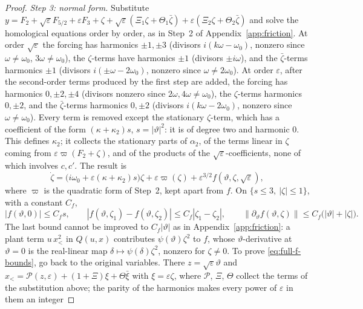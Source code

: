 \documentclass[11pt,reqno]{amsart}
\theoremstyle{plain}
\theoremstyle{definition}
\theoremstyle{remark}
\begin{document}
\begin{proof}
\emph{Step 3: normal form.} Substitute
$y=F_2+\sqrt\varepsilon F_{5/2}+\varepsilon F_3+\zeta+\sqrt\varepsilon(\Xi_1\zeta+\Theta_1\bar\zeta)+\varepsilon(\Xi_2\zeta+\Theta_2\bar\zeta)$ and solve the
homological equations order by order, as in Step~2 of Appendix~\ref{app:friction}. At order $\sqrt\varepsilon$ the forcing has
harmonics $\pm1,\pm3$ (divisors $i(k\omega-\omega_0)$, nonzero since $\omega\ne\omega_0$, $3\omega\ne\omega_0$), the $\zeta$-terms have
harmonics $\pm1$ (divisors $\pm i\omega$), and the $\bar\zeta$-terms harmonics $\pm1$ (divisors $i(\pm\omega-2\omega_0)$, nonzero since
$\omega\ne2\omega_0$). At order $\varepsilon$, after the second-order terms produced by the first step are added, the forcing has
harmonics $0,\pm2,\pm4$ (divisors nonzero since $2\omega,4\omega\ne\omega_0$), the $\zeta$-terms harmonics $0,\pm2$, and the
$\bar\zeta$-terms harmonics $0,\pm2$ (divisors $i(k\omega-2\omega_0)$, nonzero since $\omega\ne\omega_0$). Every term is removed except
the stationary $\zeta$-term, which has a coefficient of the form $(\kappa+\kappa_2)s$, $s=|\vartheta|^{2}$: it is of degree two and
harmonic $0$. This defines $\kappa_2$; it collects the stationary parts of $\alpha_2$, of the terms linear in $\zeta$ coming from $\varepsilon\varpi(F_2+\zeta)$, and of the products of the $\sqrt\varepsilon$-coefficients, none of which involves $c,c'$. The result is
\[
  \dot\zeta=\bigl(i\omega_0+\varepsilon(\kappa+\kappa_2)s\bigr)\zeta+\varepsilon\varpi(\zeta)+\varepsilon^{3/2}f(\vartheta,\zeta,\sqrt\varepsilon),
\]
where $\varpi$ is the quadratic form of Step~2, kept apart from $f$. On $\{s\le3,\ |\zeta|\le1\}$, with a constant $C_f$,
\begin{equation}\label{eq:full-f-bounds}
  |f(\vartheta,0)|\le C_fs,\qquad |f(\vartheta,\zeta_1)-f(\vartheta,\zeta_2)|\le C_f|\zeta_1-\zeta_2|,\qquad
  \|\partial_\vartheta f(\vartheta,\zeta)\|\le C_f\bigl(|\vartheta|+|\zeta|\bigr).
\end{equation}
The last bound cannot be improved to $C_f|\vartheta|$ as in Appendix~\ref{app:friction}: a plant term $u\,x_<^{2}$ in $Q(u,x)$ contributes
$\psi(\vartheta)\zeta^{2}$ to $f$, whose $\vartheta$-derivative at $\vartheta=0$ is the real-linear map $\delta\mapsto \psi(\delta)\zeta^{2}$, nonzero for $\zeta\neq0$. To prove \eqref{eq:full-f-bounds}, go back to the
original variables. There $z=\sqrt\varepsilon \vartheta$ and $x_<=\mathcal P(z,\varepsilon)+(1+\Xi)\xi+\Theta\bar\xi$ with $\xi=\varepsilon\zeta$, where $\mathcal P$, $\Xi$, $\Theta$
collect the terms of the substitution above; the parity of the harmonics makes every power of $\varepsilon$ in them an integer

\end{proof}
\end{document}
